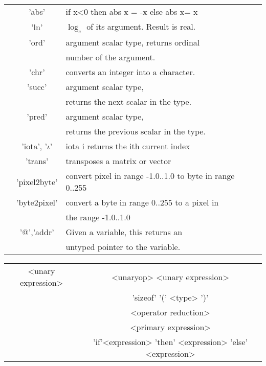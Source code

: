 {\begin{table}
{\begin{tabular}{|c|c||l|}
{\small }&
{\small 'abs'}&
{\small if x<0 then abs x = -x else abs x= x}\\
{\small }&
{\small 'ln'}&
 {\small $ \log _{e} $ of its argument. Result is real.}\\
{\small }&
{\small 'ord'}&
 {\small argument scalar type, returns ordinal }\\
&
&
{\small number of the argument.}\\
{\small }&
{\small 'chr'}&
 {\small converts an integer\index{integer} into a character\index{character}.}\\
{\small }&
{\small 'succ'}&
 {\small argument scalar type,}\\
&
&
 {\small returns the next scalar in the type.}\\
{\small }&
{\small 'pred'}&
{\small argument scalar type, }\\
&
&
{\small returns the previous scalar in the type.}\\
{\small }&
{\small 'iota', '$\iota$'}&
{\small iota i returns the ith current index\index{index}}\\
{\small }&
{\small 'trans'}&
{\small transposes a matrix\index{matrix} or vector\index{vector}}\\
{\small }&
{\small 'pixel2byte'}&
{\small convert pixel in range -1.0..1.0 to byte in range 0..255}\\
{\small }&
{\small 'byte2pixel'}&
{\small convert a byte in range 0..255 to a pixel in}\\
&
&
 {\small the range -1.0..1.0}\\
{\small }&
{\small '@','addr'}&
{\small Given a variable, this returns an} \\
&
&
{\small untyped pointer\index{pointer} to the variable.}\\
\hline 
\end{tabular}\small \par}
\end{table}

\vspace{0.3cm}
{\centering \begin{tabular}{|c|c|}
\hline 
<unary expression>&
<unaryop> <unary expression>\\
&
'sizeof' '(' <type> ')'\\
&
<operator reduction>\\
&
<primary expression>\\
\hline 
&
'if'<expression> 'then' <expression> 'else' <expression>\\
\hline 
\end{tabular}\par}
\vspace{0.3cm}


}
